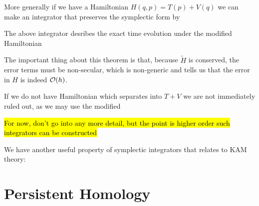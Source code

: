 \documentclass{article}
\begin{document}
More generally if we have a Hamiltonian $H(q,p) = T(p) + V(q)$ we can make an integrator that preserves the symplectic form by 
\begin{theorem}[Yoshida, 1990]
	The above integrator desribes the exact time evolution under the modified Hamiltonian 
\end{theorem}
The important thing about this theorem is that, because $\tilde{H}$ is conserved, the error terms must be non-secular, which is non-generic and tells us that the error in $H$ is indeed $\mathcal{O}(h)$.

\begin{remark}
	If we do not have Hamiltonian which separates into $T+V$ we are not immediately ruled out, as we may use the modified 
\end{remark} 

\hl{For now, don't go into any more detail, but the point is higher order such integrators can be constructed}

We have another useful property of symplectic integrators that relates to KAM theory:

\begin{theorem}
	
\end{theorem}


\section{Persistent Homology}






\end{document}
